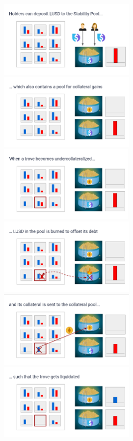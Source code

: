 \documentclass{article}
\begin{document}
\begin{figure}[h]
\centering
\includegraphics[width=6.75cm]{a5.png}
\includegraphics[width=6.75cm]{a6.png}
\includegraphics[width=6.75cm]{a7.png}
\includegraphics[width=6.75cm]{a8.png}
\includegraphics[width=6.75cm]{a9.png}
\includegraphics[width=6.75cm]{a10.png}
\end{figure}
\end{document}

